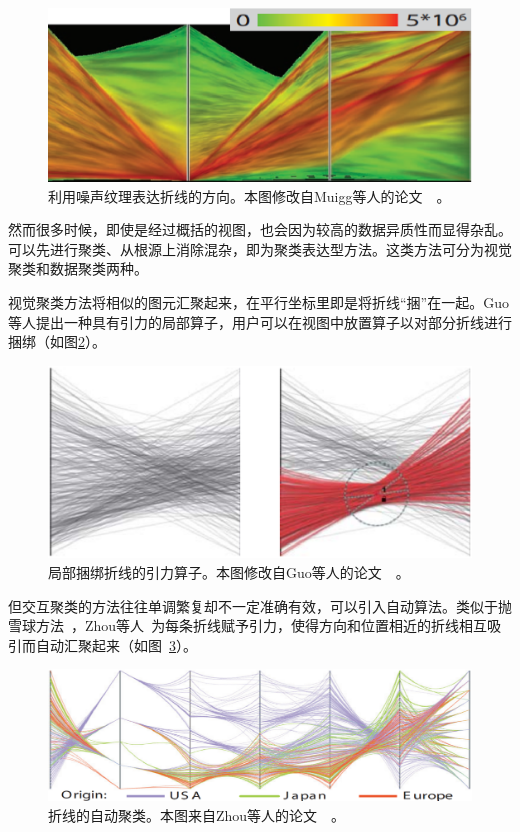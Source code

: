 \documentclass[12pt,twocolumn]{article}
\begin{document}
\begin{figure}[!htb]
\centering
\includegraphics[width=0.9\linewidth]{images/PC_Design_Abstraction3.eps}
\caption{\label{fig:PC_Design_Abstraction1}利用噪声纹理表达折线的方向。本图修改自Muigg等人的论文~\citep{muigg2011visual}~。
}
\end{figure}

然而很多时候，即使是经过概括的视图，也会因为较高的数据异质性而显得杂乱。可以先进行聚类、从根源上消除混杂，即为聚类表达型方法。这类方法可分为视觉聚类和数据聚类两种。

视觉聚类方法将相似的图元汇聚起来，在平行坐标里即是将折线“捆”在一起。Guo等人\citep{guo2010interactive}提出一种具有引力的局部算子，用户可以在视图中放置算子以对部分折线进行捆绑（如图\ref{fig:PC_Design_Clustering1}）。

\begin{figure}[!htb]
\centering
\includegraphics[width=0.85\linewidth]{images/PC_Design_Clustering1.eps}
\caption{\label{fig:PC_Design_Clustering1}局部捆绑折线的引力算子。本图修改自Guo等人的论文~\citep{guo2010interactive}~。
}
\end{figure}

但交互聚类的方法往往单调繁复却不一定准确有效，可以引入自动算法。类似于抛雪球方法~\citep{zhou2009splatting}，Zhou等人~\citep{zhou2008visual}为每条折线赋予引力，使得方向和位置相近的折线相互吸引而自动汇聚起来（如图~\ref{fig:PC_Design_Clustering2}）。

\begin{figure}[!htb]
\centering
\includegraphics[width=0.93\linewidth]{images/PC_Design_Clustering5.eps}
\caption{\label{fig:PC_Design_Clustering2}折线的自动聚类。本图来自Zhou等人的论文~\citep{zhou2008visual}~。
}
\end{figure}
\end{document}
